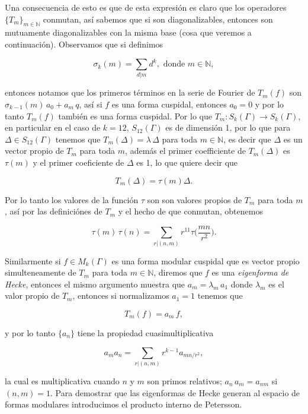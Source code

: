 \documentclass[letterpaper]{article}
\newcommand{\nat}{\ensuremath{ \mathbb N }}
\newcommand{\ga}{\ensuremath{\Gamma}}
\newcommand{\modk}{\ensuremath{M_k(\Gamma)}}
\begin{document}
Una consecuencia de esto es que de esta expresión es claro que los operadores $\lbrace T_m\rbrace_{m\in\nat}$ conmutan, así sabemos que si son diagonalizables, entonces son mutuamente diagonalizables con la misma base (cosa que veremos a continuación). Observamos que si definimos

\begin{equation}\label{sigma}
\sigma_{k}(m)=\sum_{d\vert m}d^k,\text{ donde } m\in\nat,
\end{equation}

\noindent entonces notamos que los primeros términos en la serie de Fourier de $T_m(f)$ son $\sigma_{k-1}(m)\,a_0+a_m\,q$, así si $f$ es una forma cuspidal, entonces $a_0=0$ y por lo tanto $T_m(f)$ también es una forma cuspidal. Por lo que $T_m:S_k(\ga)\rightarrow S_k(\ga)$, en particular en el caso de $k=12$, $S_{12}(\ga)$ es de dimensión 1, por lo que para $\Delta\in S_{12}(\ga)$ tenemos que $T_m(\Delta)=\lambda\,\Delta$ para toda $m\in\nat$, es decir que $\Delta$ es un vector propio de $T_m$ para toda $m$, además el primer coefficiente de $T_m(\Delta)$ es $\tau(m)$ y el primer coeficiente de $\Delta$ es 1, lo que quiere decir que

$$T_m(\Delta)=\tau(m)\Delta.$$

\noindent Por lo tanto los valores de la función $\tau$ son son valores propios de $T_m$ para toda $m$, así por las definiciónes de $T_m$ y el hecho de que conmutan, obtenemos

$$\tau(m)\,\tau(n) = \sum_{r\vert(n,m)}r^{11}\tau\Big(\frac{mn}{r^2}\Big).$$

Similarmente si $f\in\modk$ es una forma modular cuspidal que es vector propio simulteneamente de $T_m$ para toda $m\in\nat$, diremos que $f$ es una \textit{eigenforma de Hecke}, entonces el mismo argumento muestra que $a_m=\lambda_m\,a_1$ donde $\lambda_m$ es el valor propio de $T_m$, entonces si normalizamos $a_1 = 1$ tenemos que

$$T_m(f)= a_m\,f,$$

\noindent y por lo tanto $\lbrace a_n\rbrace$ tiene la propiedad cuasimultiplicativa

$$a_m a_n = \sum_{r\vert(n,m)}r^{k-1}a_{mn/r^2},$$

\noindent la cual es multiplicativa cuando $n$ y $m$ son primos relativos; $a_n\,a_m=a_{nm}$ si $(n,m)=1$. Para demostrar que las eigenformas de Hecke generan al espacio de formas modulares introducimos el producto interno de Petersson.
\end{document}
